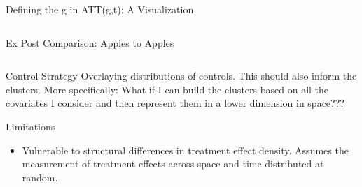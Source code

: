 \begin{frame}{Defining the g in ATT(g,t): A Visualization}
\begin{columns}
\begin{column}{0.4\linewidth}
      \caption{\footnotesize{Ex Post Comparison: Apples to Apples}}
    \end{column}
  \end{columns}
\end{frame}

\begin{frame}{Control Strategy}
    Overlaying distributions of controls. This should also inform the clusters.
    More specifically: What if I can build the clusters based on all the covariates I consider and then represent them in a lower dimension in space???
\end{frame}

\begin{frame}{Limitations}
\begin{itemize}
    \item Vulnerable to structural differences in treatment effect density. Assumes the measurement of treatment effects across space and time distributed at random. 
\end{itemize}
    
\end{frame}